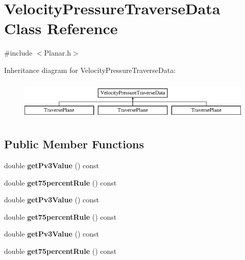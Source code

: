 \hypertarget{class_velocity_pressure_traverse_data}{}\section{Velocity\+Pressure\+Traverse\+Data Class Reference}
\label{class_velocity_pressure_traverse_data}


{\ttfamily \#include $<$Planar.\+h$>$}

Inheritance diagram for Velocity\+Pressure\+Traverse\+Data\+:\begin{figure}[H]
\begin{center}
\leavevmode
\includegraphics[height=1.924399cm]{d8/d09/class_velocity_pressure_traverse_data}
\end{center}
\end{figure}
\subsection*{Public Member Functions}
\begin{DoxyCompactItemize}
\item 
\mbox{\label{class_velocity_pressure_traverse_data_ad40651783106845a732537b60877c70f}} 
double {\bfseries get\+Pv3\+Value} () const
\item 
\mbox{\label{class_velocity_pressure_traverse_data_aabde4db04d805c4264d3fc2036ef38a8}} 
double {\bfseries get75percent\+Rule} () const
\item 
\mbox{\label{class_velocity_pressure_traverse_data_ad40651783106845a732537b60877c70f}} 
double {\bfseries get\+Pv3\+Value} () const
\item 
\mbox{\label{class_velocity_pressure_traverse_data_aabde4db04d805c4264d3fc2036ef38a8}} 
double {\bfseries get75percent\+Rule} () const
\item 
\mbox{\label{class_velocity_pressure_traverse_data_ad40651783106845a732537b60877c70f}} 
double {\bfseries get\+Pv3\+Value} () const
\item 
\mbox{\label{class_velocity_pressure_traverse_data_aabde4db04d805c4264d3fc2036ef38a8}} 
double {\bfseries get75percent\+Rule} () const
\end{DoxyCompactItemize}
